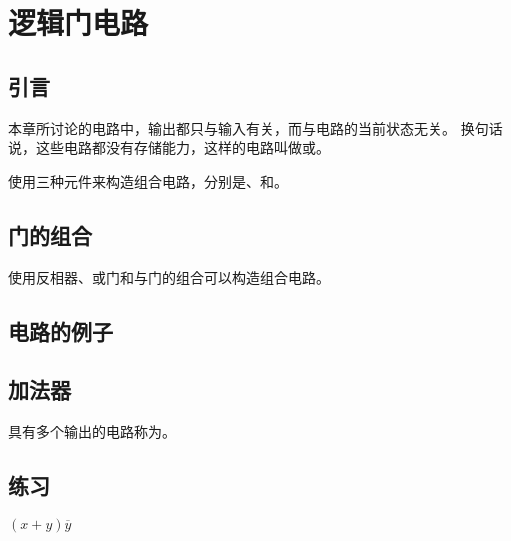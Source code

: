 
\section{逻辑门电路}
{
    \subsection{引言}
    {
        本章所讨论的电路中，输出都只与输入有关，而与电路的当前状态无关。
        换句话说，这些电路都没有存储能力，这样的电路叫做或。

        使用三种元件来构造组合电路，分别是、和。
    }

    \subsection{门的组合}
    {
        使用反相器、或门和与门的组合可以构造组合电路。
    }

    \subsection{电路的例子}
    {

    }

    \subsection{加法器}
    {
        具有多个输出的电路称为。
    }

    \subsection{练习}
    {
        \begin{practices}
            $(x + y)\overline{y}$
        \end{practices}

        \begin{practices}
            
        \end{practices}
    }
}
